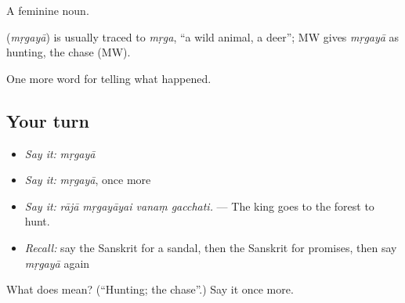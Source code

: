 A feminine noun.

\begin{cousinweb}
\textbf{} (\emph{mṛgayā}) is usually traced to \emph{mṛga}, \textquotedblleft{}a wild animal, a deer\textquotedblright{}; MW gives \emph{mṛgayā} as hunting, the chase (MW).
\end{cousinweb}

\begin{grammarlens}[title={What you've built}]
One more word for telling what happened.
\end{grammarlens}

\subsection*{Your turn}
\begin{itemize}
\raggedright
  \item \emph{Say it:} \emph{mṛgayā}
  \item \emph{Say it:} \emph{mṛgayā}, once more
  \item \emph{Say it:} \emph{rājā mṛgayāyai vanaṃ gacchati.} — The king goes to the forest to hunt.
  \item \emph{Recall:} say the Sanskrit for a sandal, then the Sanskrit for promises, then say \emph{mṛgayā} again
\end{itemize}

\begin{tcolorbox}[breakable,colback=teal!4,colframe=teal!35!black,title={Before you move on}]
What does  mean? (\textquotedblleft{}Hunting; the chase\textquotedblright{}.) Say it once more.
\end{tcolorbox}
